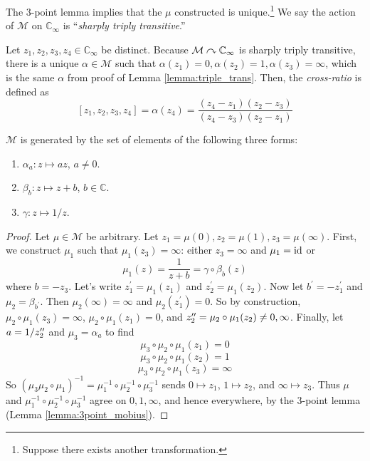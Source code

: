 \documentclass[10pt, a4paper, twoside]{report}
\begin{document}
\begin{remark}
    The 3-point lemma implies that the \(\mu\) constructed is unique.\footnote{Suppose there exists another transformation.} We say the action of \(\mathcal{M}\) on \(\mathbb{C}_\infty\) is ``\emph{sharply triply transitive}.''
\end{remark}
\begin{definition}
    Let \(z_1,z_2,z_3,z_4\in\mathbb{C}_\infty\) be distinct. Because \(\mathcal{M}\curvearrowright\mathbb{C}_\infty\) is sharply triply transitive, there is a unique \(\alpha\in\mathcal{M}\) such that \(\alpha(z_1)=0,\alpha(z_2)=1,\alpha(z_3)=\infty\), which is the same \(\alpha\) from proof of Lemma \ref{lemma:triple_trans}. Then, the \emph{cross-ratio} is defined as 
    \[[z_1,z_2,z_3,z_4]=\alpha(z_4)=\frac{(z_4-z_1)(z_2-z_3)}{(z_4-z_3)(z_2-z_1)}\]
\end{definition}
\begin{proposition}
    \(\mathcal{M}\) is generated by the set of elements of the following three forms:
    \begin{enumerate}
        \item \(\alpha_a:z\mapsto az\), \(a\neq 0\).
        \item \(\beta_b:z\mapsto z+b\), \(b\in\mathbb{C}\).
        \item \(\gamma:z\mapsto 1/z\).
    \end{enumerate}
    \label{prop:mobius_gen}
\end{proposition}
\begin{proof}
    Let \(\mu\in\mathcal{M}\) be arbitrary. Let \(z_1=\mu(0),z_2=\mu(1),z_3=\mu(\infty)\). First, we construct \(\mu_1\) such that \(\mu_1(z_3)=\infty\): either \(z_3=\infty\) and \(\mu_1=\operatorname{id}\) or 
    \[\mu_1(z)=\frac{1}{z+b}=\gamma\circ\beta_b(z)\]
    where \(b=-z_3\). Let's write \(z_1^\prime=\mu_1(z_1)\) and \(z_2^\prime=\mu_1(z_2)\). Now let \(b^\prime=-z_1^\prime\) and \(\mu_2=\beta_{b^\prime}\). Then \(\mu_2(\infty)=\infty\) and \(\mu_2(z_1^\prime)=0\). So by construction, \(\mu_2\circ\mu_1(z_3)=\infty\), \(\mu_2\circ\mu_1(z_1)=0\), and \(z_2^{\prime\prime}=\mu_2\circ\mu_1(z_2)\neq 0,\infty\). Finally, let \(a=1/z_2^{\prime\prime}\) and \(\mu_3=\alpha_a\) to find 
    \[\mu_3\circ\mu_2\circ\mu_1(z_1)=0\]
    \[\mu_3\circ\mu_2\circ\mu_1(z_2)=1\]
    \[\mu_3\circ\mu_2\circ\mu_1(z_3)=\infty\]
    So \((\mu_3\mu_2\circ\mu_1)^{-1}=\mu_1^{-1}\circ\mu_2^{-1}\circ\mu_3^{-1}\) sends \(0\mapsto z_1\), \(1\mapsto z_2\), and \(\infty\mapsto z_3\). Thus \(\mu\) and \(\mu_1^{-1}\circ\mu_2^{-1}\circ\mu_3^{-1}\) agree on \(0,1,\infty\), and hence everywhere, by the 3-point lemma (Lemma \ref{lemma:3point_mobius}).
\end{proof}
    
\end{document}
